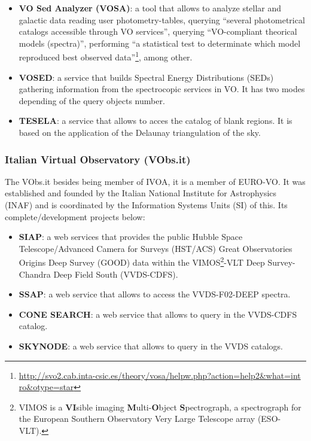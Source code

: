 \begin{itemize}
\item \textbf{VO Sed Analyzer (VOSA)}:
a tool that allows to analyze stellar and galactic data reading user
photometry-tables, querying ``several photometrical catalogs accessible through
VO services'', querying ``VO-compliant theorical models (spectra)'', performing
``a statistical test to determinate which model reproduced best observed
data''\footnote{\url{http://svo2.cab.inta-csic.es/theory/vosa/helpw.php?action=help2&what=int                     ro&otype=star}}, among other. 

\item \textbf{VOSED}:
a service that builds Spectral Energy Distributions (SEDs) gathering information
from the spectrocopic services in VO. It has two modes depending of the query
objects number.

\item \textbf{TESELA}:
a service that allows to acces the catalog of blank regions. It is based on the
application of the Delaunay triangulation of the sky.
\end{itemize}

\subsubsection{Italian Virtual Observatory (VObs.it)}
The VObs.it \cite{website:vobs.it-home} besides being member of IVOA, it is a
member of EURO-VO. It was established and founded by the Italian National
Institute for Astrophysics (INAF) and is coordinated by the Information Systems
Units (SI) of this. Its complete/development projects below:

\begin{itemize}
\item \textbf{SIAP}:
a web services that provides the public Hubble Space Telescope/Advanced Camera
for Surveys (HST/ACS) Great Observatories Origins Deep Survey (GOOD) data within
the VIMOS\footnote{VIMOS is a \textbf{VI}sible imaging
\textbf{M}ulti-\textbf{O}bject \textbf{S}pectrograph, a spectrograph for the
European Southern Observatory Very Large Telescope array (ESO-VLT).}-VLT Deep
Survey-Chandra Deep Field South (VVDS-CDFS).

\item \textbf{SSAP}:
a web service that allows to access the VVDS-F02-DEEP spectra.

\item \textbf{CONE SEARCH}:
a web service that allows to query in the VVDS-CDFS catalog. 

\item \textbf{SKYNODE}:
a web service that allows to query in the VVDS catalogs. 
\end{itemize}

